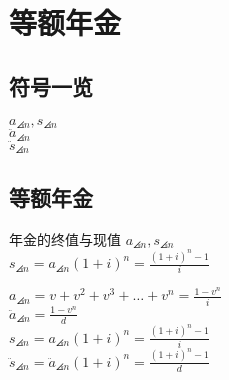\chapter{等额年金}
\section{符号一览}
\noindent$a_{\angles{n}},s_{\angles{n}}$\\	$\ddot{a}_{\angles{n}}$\\$\ddot{s}_{\angles{n}}$
\section{等额年金}
\begin{definition}{年金的终值与现值}
\noindent $a_{\angles{n}},s_{\angles{n}}$\\
$s_{\angles{n}}=a_{\angles{n}}(1+i)^{n}=\frac{(1+i)^{n}-1}{i}$
\end{definition}
\noindent $a_{\angles{n}}=v+v^2+v^3+\dots+v^n=\frac{1-v^n}{i}$\\
$\ddot{a}_{\angles{n}}=\frac{1-v^n}{d}$ \\
$s_{\angles{n}}=a_{\angles{n}}(1+i)^{n}=\frac{(1+i)^{n}-1}{i}$\\
$\ddot{s}_{\angles{n}}=\ddot{a}_{\angles{n}}(1+i)^{n}=\frac{(1+i)^{n}-1}{d}$